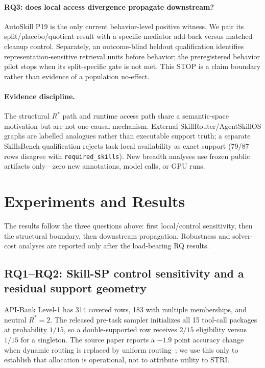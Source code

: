 \paragraph{RQ3: does local access divergence propagate downstream?}
AutoSkill P19 is the only current behavior-level positive witness. We pair its split/placebo/quotient result with a specific-mediator add-back versus matched cleanup control. Separately, an outcome-blind heldout qualification identifies representation-sensitive retrieval units before behavior; the preregistered behavior pilot stops when its split-specific gate is not met. This STOP is a claim boundary rather than evidence of a population no-effect.

\paragraph{Evidence discipline.}
The structural $R^*$ path and runtime access path share a semantic-space motivation but are not one causal mechanism. External SkillRouter/AgentSkillOS graphs are labelled analogues rather than executable support truth; a separate SkillsBench qualification rejects task-local availability as exact support (79/87 rows disagree with \texttt{required\_skills}). New breadth analyses use frozen public artifacts only---zero new annotations, model calls, or GPU runs.



\section{Experiments and Results}
\label{sec:evidence}
The results follow the three questions above: first local/control sensitivity, then the structural boundary, then downstream propagation. Robustness and solver-cost analyses are reported only after the load-bearing RQ results.

\subsection{RQ1--RQ2: Skill-SP control sensitivity and a residual support geometry}
API-Bank Level-1 has 314 covered rows, 183 with multiple memberships, and neutral $R^*=2$. The released pre-task sampler initializes all 15 tool-call packages at probability $1/15$, so a double-supported row receives $2/15$ eligibility versus $1/15$ for a singleton. The source paper reports a $-1.9$ point accuracy change when dynamic routing is replaced by uniform routing~\citep{huang2026skill}; we use this only to establish that allocation is operational, not to attribute utility to STRI.

